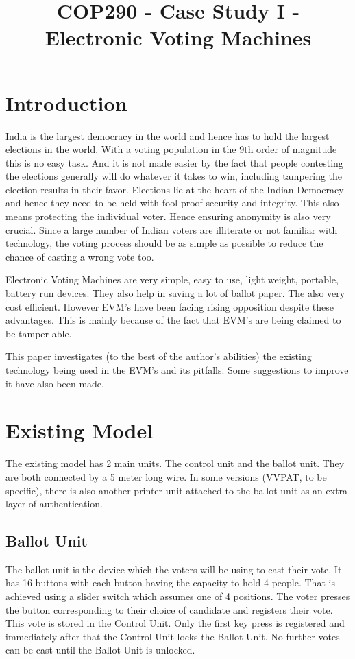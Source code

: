 \documentclass[a4paper,11pt]{article}
\title{COP290 - Case Study I - Electronic Voting Machines}
\author{N. Akash \\ \href{iakash2702@gmail.com}}
\begin{document}
\maketitle

\section{Introduction}
India is the largest democracy in the world and hence has to hold the largest elections in the world. With a voting population in the 9th order of magnitude this is no easy task. And it is not made easier by the fact that people contesting the elections generally will do whatever it takes to win, including tampering the election results in their favor. Elections lie at the heart of the Indian Democracy and hence they need to be held with fool proof security and integrity. This also means protecting the individual voter. Hence ensuring anonymity is also very crucial. Since a large number of Indian voters are illiterate or not familiar with technology, the voting process should be as simple as possible to reduce the chance of casting a wrong vote too. 

Electronic Voting Machines are very simple, easy to use, light weight, portable, battery run devices. They also help in saving a lot of ballot paper. The also very cost efficient. However EVM's have been facing rising opposition despite these advantages. This is mainly because of the fact that EVM's are being claimed to be tamper-able.  

This paper investigates (to the best of the author's abilities) the existing technology being used in the EVM's and its pitfalls. Some suggestions to improve it have also been made.


\section{Existing Model}
The existing model has 2 main units. The control unit and the ballot unit. They are both connected by a 5 meter long wire. In some versions (VVPAT, to be specific), there is also another printer unit attached to the ballot unit as an extra layer of authentication. 

\subsection{Ballot Unit}
The ballot unit is the device which the voters will be using to cast their vote. It has 16 buttons with each button having the capacity to hold 4 people. That is achieved using a slider switch which assumes one of 4 positions. The voter presses the button corresponding to their choice of candidate and registers their vote. This vote is stored in the Control Unit. Only the first key press is registered and immediately after that the Control Unit locks the Ballot Unit. No further votes can be cast until the Ballot Unit is unlocked. 
\end{document}
